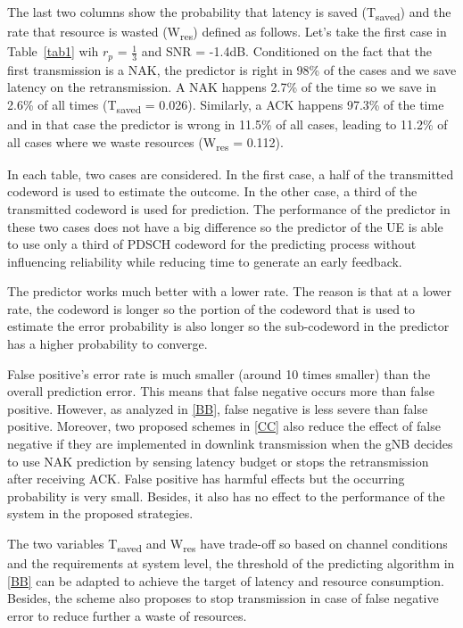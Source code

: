 \documentclass[conference]{IEEEtran}
\begin{document}
The last two columns show the probability that latency is saved (T\textsubscript{saved}) and the rate that resource is wasted (W\textsubscript{res}) defined as follows. Let's take the first case in Table~\ref{tab1} wih $r_{p}$ = $\frac{1}{3}$ and SNR = -1.4dB. Conditioned on the fact that the first transmission is a NAK, the predictor is right in 98\% of the cases and we save latency on the retransmission. A NAK happens 2.7\% of the time so we save in 2.6\% of all times (T\textsubscript{saved} = 0.026). Similarly, a ACK happens 97.3\% of the time and in that case the predictor is wrong in 11.5\% of all cases, leading to 11.2\% of all cases where we waste resources (W\textsubscript{res} = 0.112).

In each table, two cases are considered. In the first case, a half of the transmitted codeword is used to estimate the outcome. In the other case, a third of the transmitted codeword is used for prediction. The performance of the predictor in these two cases does not have a big difference so the predictor of the UE is able to use only a third of PDSCH codeword for the predicting process without influencing reliability while reducing time to generate an early feedback.

The predictor works much better with a lower rate. The reason is that at a lower rate, the codeword is longer so the portion of the codeword that is used to estimate the error probability is also longer so the sub-codeword in the predictor has a higher probability to converge.

False positive's error rate is much smaller (around 10 times smaller) than the overall prediction error. This means that false negative occurs more than false positive. However, as analyzed in \ref{BB}, false negative is less severe than false positive. Moreover, two proposed schemes in \ref{CC} also reduce the effect of false negative if they are implemented in downlink transmission when the gNB decides to use NAK prediction by sensing latency budget or stops the retransmission after receiving ACK. False positive has harmful effects but the occurring probability is very small. Besides, it also has no effect to the performance of the system in the proposed strategies. 

The two variables T\textsubscript{saved} and W\textsubscript{res} have trade-off so based on channel conditions and the requirements at system level, the threshold of the predicting algorithm in \ref{BB} can be adapted to achieve the target of latency and resource consumption. Besides, the scheme also proposes to stop transmission in case of false negative error to reduce further a waste of resources.
\end{document}
